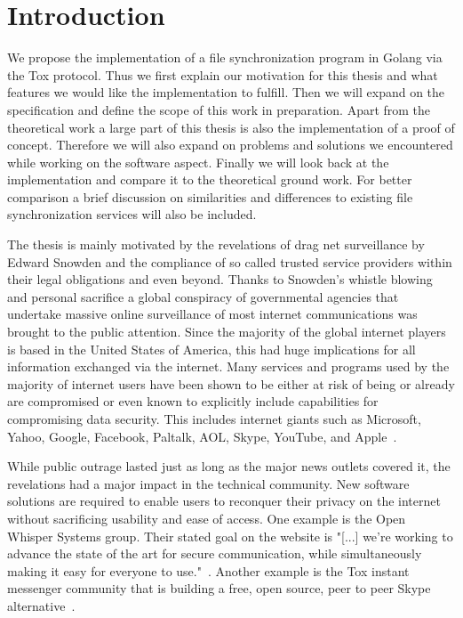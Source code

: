\chapter{Introduction}
\label{chap:Introduction}

We propose the implementation of a file synchronization program in Golang via the Tox protocol.
Thus we first explain our motivation for this thesis and what features we would like the implementation to fulfill.
Then we will expand on the specification and define the scope of this work in preparation.
Apart from the theoretical work a large part of this thesis is also the implementation of a proof of concept.
Therefore we will also expand on problems and solutions we encountered while working on the software aspect.
Finally we will look back at the implementation and compare it to the theoretical ground work.
For better comparison a brief discussion on similarities and differences to existing file synchronization services will also be included.

\label{sec:Motivation} %

The thesis is mainly motivated by the revelations of drag net surveillance by Edward Snowden and the compliance of so called trusted service providers within their legal obligations and even beyond.
Thanks to Snowden's whistle blowing and personal sacrifice a global conspiracy of governmental agencies that undertake massive online surveillance of most internet communications was brought to the public attention.
Since the majority of the global internet players is based in the United States of America, this had huge implications for all information exchanged via the internet.
Many services and programs used by the majority of internet users have been shown to be either at risk of being or already are compromised or even known to explicitly include capabilities for compromising data security.
This includes internet giants such as Microsoft, Yahoo, Google, Facebook, Paltalk, AOL, Skype, YouTube, and Apple~\cite{web:site:wp:internet_giants}.

While public outrage lasted just as long as the major news outlets covered it, the revelations had a major impact in the technical community.
New software solutions are required to enable users to reconquer their privacy on the internet without sacrificing usability and ease of access.
One example is the Open Whisper Systems group.
Their stated goal on the website is "[...] we're working to advance the state of the art for secure communication, while simultaneously making it easy for everyone to use."~\cite{web:site:whispersystems}.
Another example is the Tox instant messenger community that is building a free, open source, peer to peer Skype alternative~\cite{web:site:tox}.

